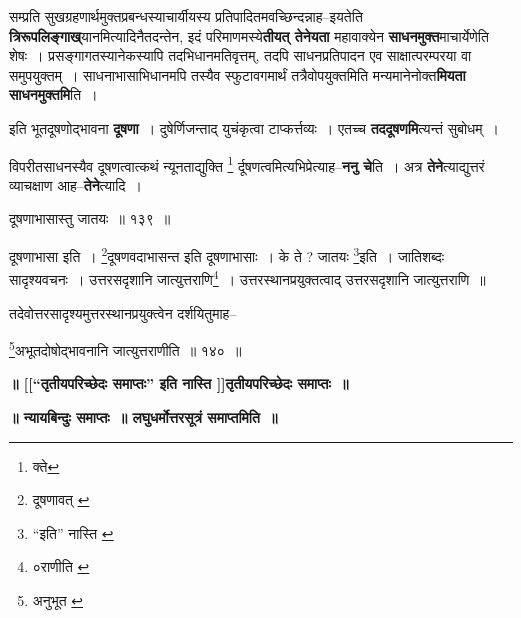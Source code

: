 \documentclass[article,12pt,a4paper]{memoir}
\begin{document}
	  \pstart सम्प्रति सुखग्रहणार्थमुक्तप्रबन्धस्याचार्यीयस्य प्रतिपादितमवच्छिन्दन्नाह--इयतेति \textbf{त्रिरूपलिङ्गाख्}यानमित्यादिनैतदन्तेन, इदं परिमाणमस्ये\textbf{तीयत् तेनेयता} महावाक्येन \textbf{साधनमुक्त}माचार्येणेति शेषः । प्रसङ्गागतस्यानेकस्यापि तदभिधानमतिवृत्तम्, तदपि साधनप्रतिपादन एव साक्षात्परम्परया वा समुपयुक्तम् । साधनाभासाभिधानमपि तस्यैव स्फुटावगमार्थं तत्रैवोपयुक्तमिति मन्यमानेनोक्त\textbf{मियता साधनमुक्तमि}ति ।
	\pend
      

	  \pstart इति भूतदूषणोद्भावना \textbf{दूषणा} । दुषेर्णिजन्ताद् युचंकृत्वा टाप्कर्त्तव्यः । एतच्च \textbf{तददूषणमि}त्यन्तं सुबोधम् ।
	\pend
      

	  \pstart विपरीतसाधनस्यैव दूषणत्वात्कथं न्यूनताद्युक्ति \footnote{क्ते} र्दूषणत्वमित्यभिप्रेत्याह--\textbf{ननु चे}ति । अत्र \textbf{तेने}त्याद्युत्तरं व्याचक्षाण आह--\textbf{तेने}त्यादि ।
	\pend
	  \bigskip
	  \begingroup
	
	  \bigskip
	  \begingroup
	

	  \pstart दूषणाभासास्तु जातयः ॥ १३९ ॥
	\pend
      
	  \endgroup
	 

	  \pstart दूषणाभासा इति । \footnote{दूषणावत् \cite{dp-msB}}\-दूषणवदाभासन्त इति दूषणाभासाः । के ते ? जातयः \footnote{“इति” नास्ति \cite{dp-msA} \cite{dp-msB} \cite{dp-edP} \cite{dp-edH} \cite{dp-edE} \cite{dp-edN}}\-इति । जातिशब्दः सादृश्यवचनः । उत्तरसदृशानि जात्युत्तराणि\footnote{०राणीति \cite{dp-msA} \cite{dp-edP} \cite{dp-edH} \cite{dp-edE}} । उत्तरस्थानप्रयुक्तत्वाद् उत्तरसदृशानि जात्युत्तराणि ॥
	\pend
       

	  \pstart तदेवोत्तरसादृश्यमुत्तरस्थानप्रयुक्त्वेन दर्शयितुमाह--
	\pend
       
	  \bigskip
	  \begingroup
	

	  \pstart \footnote{अनुभूत \cite{dp-msB} \cite{dp-edP} \cite{dp-edH}}\-अभूतदोषोद्भावनानि जात्युत्तराणीति ॥ १४० ॥
	\pend
      
	  \endgroup
	 

	  \begin{center}%
	\textbf{॥ [[“तृतीयपरिच्छेदः समाप्तः” इति नास्ति \cite{dp-msC} \cite{dp-msD}]]तृतीयपरिच्छेदः समाप्तः ॥}
	\end{center}
	 

	  \begin{center}%
	\textbf{॥ न्यायबिन्दुः समाप्तः ॥ लघुधर्मोत्तरसूत्रं समाप्तमिति ॥}
	\end{center}
	
\end{document}
